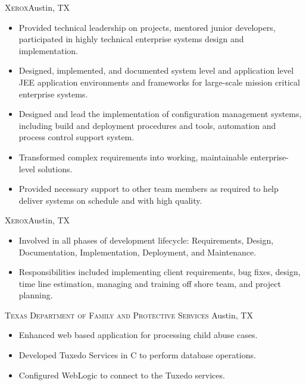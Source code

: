 \documentclass[11pt,letterpaper,sans]{moderncv}
\begin{document}
     {\textsc{Xerox}}{Austin, TX}{}
     {\begin{itemize}
         \item Provided technical leadership on projects, mentored junior 
               developers, participated in highly technical enterprise 
               systems design and implementation.
         \item Designed, implemented, and documented system level and 
               application level JEE application environments and frameworks 
               for large-scale mission critical enterprise systems.
         \item Designed and lead the implementation of configuration 
               management systems, including build and deployment procedures 
               and tools, automation and process control support system.
         \item Transformed complex requirements into working, maintainable 
               enterprise-level solutions.
         \item Provided necessary support to other team members as required 
               to help deliver systems on schedule and with high quality.
     \end{itemize}}
      
     {\textsc{Xerox}}{Austin, TX}{}
     {\begin{itemize}
         \item Involved in all phases of development lifecycle: 
               Requirements, Design, Documentation, Implementation, 
               Deployment, and Maintenance.
         \item Responsibilities included implementing client requirements, bug
               fixes, design, time line estimation, managing and training off
               shore team, and project planning.
     \end{itemize}}
     
     {\textsc{Texas Department of Family and Protective Services}}
             {Austin, TX}{}
     {\begin{itemize}
         \item Enhanced web based application for processing child
               abuse cases.
         \item Developed Tuxedo Services in C to perform database operations.
         \item Configured WebLogic to connect to the Tuxedo services.
     \end{itemize}}
\end{document}
